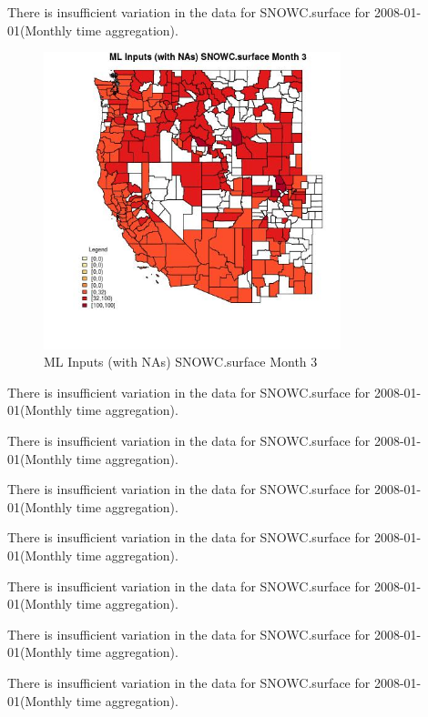 There is insufficient variation in the data for SNOWC.surface for 2008-01-01(Monthly time aggregation). 
 

\begin{figure} 
\centering  
\includegraphics[width=0.77\textwidth]{Code_Outputs/Report_ML_input_PM25_Step4_part_f_de_duplicated_aves_prioritize_24hr_obswNAs_CountySNOWCsurfacemedianMonth3.jpg} 
\caption{\label{fig:Report_ML_input_PM25_Step4_part_f_de_duplicated_aves_prioritize_24hr_obswNAsCountySNOWCsurfacemedianMonth3}ML Inputs (with NAs) SNOWC.surface Month 3} 
\end{figure} 
 

There is insufficient variation in the data for SNOWC.surface for 2008-01-01(Monthly time aggregation). 
 

There is insufficient variation in the data for SNOWC.surface for 2008-01-01(Monthly time aggregation). 
 

There is insufficient variation in the data for SNOWC.surface for 2008-01-01(Monthly time aggregation). 
 

There is insufficient variation in the data for SNOWC.surface for 2008-01-01(Monthly time aggregation). 
 

There is insufficient variation in the data for SNOWC.surface for 2008-01-01(Monthly time aggregation). 
 

There is insufficient variation in the data for SNOWC.surface for 2008-01-01(Monthly time aggregation). 
 

There is insufficient variation in the data for SNOWC.surface for 2008-01-01(Monthly time aggregation). 
 


